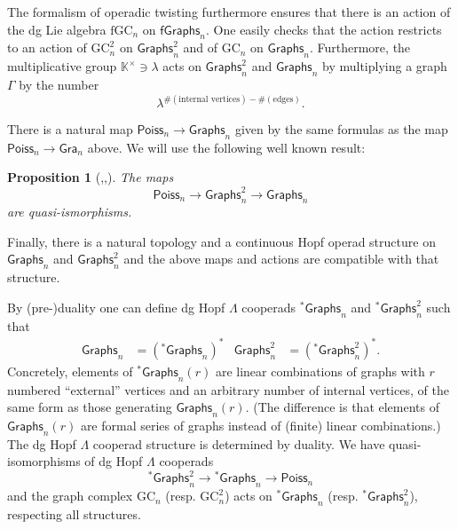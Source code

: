 \documentclass[a4paper]{amsart}
\theoremstyle{plain}
\newtheorem{prop}[thm]{Proposition}
\theoremstyle{definition}
\newcommand{\K}{{\mathbb{K}}}
\newcommand{\Graphs}{{\mathsf{Graphs}}}
\newcommand{\fGraphs}{{\mathsf{fGraphs}}}
\newcommand{\Poiss}{{\mathsf{Poiss}}}
\newcommand{\Gra}{{\mathsf{Gra}}}
\newcommand{\La}{\Lambda}
\newcommand{\GC}{\mathrm{GC}}
\newcommand{\fGC}{\mathrm{fGC}}
\newcommand{\stG}{{}^*\Graphs}
\begin{document}
The formalism of operadic twisting furthermore ensures that there is an action of the dg Lie algebra $\fGC_n$ on $\fGraphs_n$. One easily checks that the action restricts to an action of $\GC_n^2$ on $\Graphs_n^2$ and of $\GC_n$ on $\Graphs_n$.
Furthermore, the multiplicative group $\K^\times\ni \lambda$ acts on $\Graphs_n^2$ and $\Graphs_n$ by multiplying a graph $\Gamma$ by the number
\[
 \lambda^{\#(\text{internal vertices})-\#(\text{edges})}.
\]


There is a natural map $\Poiss_n\to \Graphs_n$ given by the same formulas as the map $\Poiss_n\to \Gra_n$ above. We will use the following well known result:
\begin{prop}[\cite{K2},\cite{LV},\cite{Will}]
The maps 
\[
\Poiss_n\to \Graphs_n^2 \to\Graphs_n 
\]
are quasi-ismorphisms.
\end{prop}

Finally, there is a natural topology and a continuous Hopf operad structure on $\Graphs_n$ and $\Graphs_n^2$ and the above maps and actions are compatible with that structure.

By (pre-)duality one can define dg Hopf $\La$ cooperads $\stG_n$ and $\stG_n^2$ such that 
\begin{align*}
 \Graphs_n &= (\stG_n)^* & \Graphs_n^2 &= (\stG_n^2)^*.
\end{align*}
Concretely, elements of $\stG_n(r)$ are linear combinations of graphs with $r$ numbered ``external'' vertices and an arbitrary number of internal vertices, of the same form as those generating $\Graphs_n(r)$. 
(The difference is that elements of $\Graphs_n(r)$ are formal series of graphs instead of (finite) linear combinations.)
The dg Hopf $\La$ cooperad structure is determined by duality. We have quasi-isomorphisms of dg Hopf $\La$ cooperads
\[
 \stG_n^2 \to \stG_n\to \Poiss_n
\]
and the graph complex $\GC_n$ (resp. $\GC_n^2$) acts on $\stG_n$ (resp. $\stG_n^2$), respecting all structures.
\end{document}
